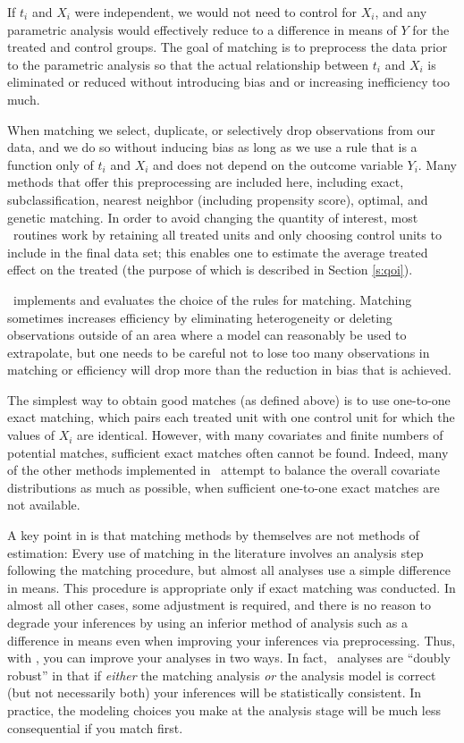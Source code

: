 If $t_i$ and $X_i$ were independent, we would not need to control for
$X_i$, and any parametric analysis would effectively reduce to a
difference in means of $Y$ for the treated and control groups.  The
goal of matching is to preprocess the data prior to the parametric
analysis so that the actual relationship between $t_i$ and $X_i$ is
eliminated or reduced without introducing bias and or increasing
inefficiency too much.  

When matching we select, duplicate, or selectively drop observations
from our data, and we do so without inducing bias as long as we use a
rule that is a function only of $t_i$ and $X_i$ and does not depend on
the outcome variable $Y_i$.  Many methods that offer this
preprocessing are included here, including exact, subclassification,
nearest neighbor (including propensity score), optimal, and genetic
matching.  In order to avoid changing the quantity of interest, most
\MatchIt\ routines work by retaining all treated units and only
choosing control units to include in the final data set; this enables
one to estimate the average treated effect on the treated (the purpose
of which is described in Section \ref{s:qoi}).

\MatchIt\ implements and evaluates the choice of the rules for
matching.  Matching sometimes increases efficiency by eliminating
heterogeneity or deleting observations outside of an area where a
model can reasonably be used to extrapolate, but one needs to be
careful not to lose too many observations in matching or efficiency
will drop more than the reduction in bias that is achieved.

The simplest way to obtain good matches (as defined above) is to use
one-to-one exact matching, which pairs each treated unit with one
control unit for which the values of $X_i$ are identical.  However,
with many covariates and finite numbers of potential matches, 
sufficient exact matches often cannot be found.  Indeed, many of the
other methods implemented in \MatchIt\ attempt to balance the overall
covariate distributions as much as possible, when sufficient
one-to-one exact matches are not available.

A key point in \citet*{HoImaKin07} is that matching methods by
themselves are not methods of estimation: Every use of matching in the
literature involves an analysis step following the matching procedure,
but almost all analyses use a simple difference in means.  This
procedure is appropriate only if exact matching was conducted.  In
almost all other cases, some adjustment is required, and there is no
reason to degrade your inferences by using an inferior method of
analysis such as a difference in means even when improving your
inferences via preprocessing.  Thus, with \MatchIt, you can improve
your analyses in two ways.  In fact, \MatchIt\ analyses are ``doubly
robust'' in that if \emph{either} the matching analysis \emph{or} the
analysis model is correct (but not necessarily both) your inferences
will be statistically consistent.  In practice, the modeling choices
you make at the analysis stage will be much less consequential if you
match first.

